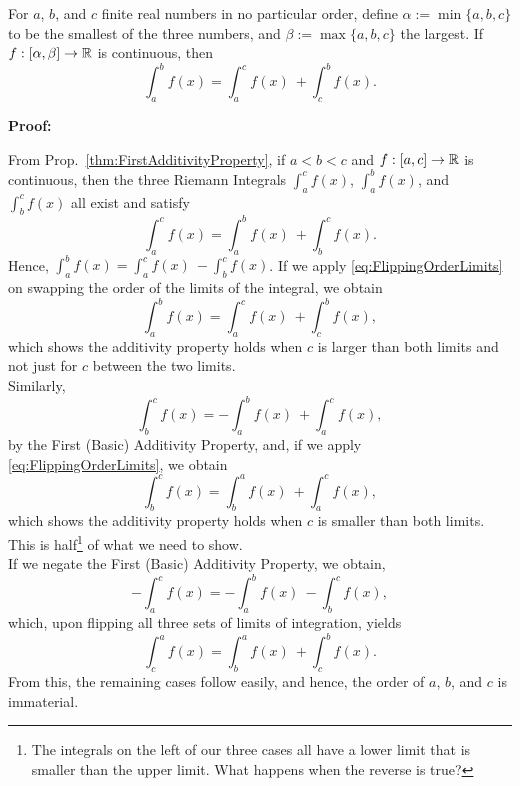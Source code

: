 \begin{tcolorbox}[title=\textcolor{black}{Proof of Cor.~\ref{thm:CorollaryFirstAdditivityProperty} (Generalized First Additivity Property)}, sharp corners, colback=green!30, colframe=green!80!blue, breakable, fonttitle=\bfseries]

For $a$, $b$, and $c$ finite real numbers in no particular order, define $\alpha:= \min\{a, b, c\}$ to be the smallest of the three numbers, and $\beta:= \max\{a, b, c\}$ the largest. If $f:[\alpha, \beta] \to \mathbb R$ is continuous, then
\begin{equation}
\label{eq:FirstAdditivityPropertyRearranged02}
    \int_{a}^{b} f(x) = \int_{a}^{c} f(x)~ + \int_{c}^{b} f(x).
\end{equation}    

\end{tcolorbox}

\textbf{Proof:} 

From Prop.~\ref{thm:FirstAdditivityProperty}, if $a < b <c$ and $f:[a, c] \to \mathbb R$ is continuous, then the three Riemann Integrals  $\int_{a}^{c} f(x)$, $\int_{a}^{b} f(x)$, and $\int_{b}^{c} f(x)$ all exist and satisfy
$$
    \int_{a}^{c} f(x) =\int_{a}^{b} f(x)~ + \int_{b}^{c} f(x).
$$
Hence,  $\int_{a}^{b} f(x) = \int_{a}^{c} f(x)~ -  \int_{b}^{c} f(x)$.
If we apply \eqref{eq:FlippingOrderLimits} on swapping the order of the limits of the integral, we obtain
$$ \int_{a}^{b} f(x)  =  \int_{a}^{c} f(x)~ +\int_{c}^{b} f(x),$$
which shows the additivity property holds when $c$ is larger than both limits and not just for $c$ between the two limits. \\

Similarly, 
$$  \int_{b}^{c} f(x) = - \int_{a}^{b} f(x)~ + \int_{a}^{c} f(x),$$
by the First (Basic) Additivity Property, and, if we apply \eqref{eq:FlippingOrderLimits}, we obtain
$$ \int_{b}^{c} f(x)  =   \int_{b}^{a} f(x)~ + \int_{a}^{c} f(x),$$
which shows the additivity property holds when $c$ is smaller than both limits. This is half\footnote{The integrals on the left of our three cases all have a lower limit that is smaller than the upper limit. What happens when the reverse is true?} of what we need to show.\\

If we negate the First (Basic) Additivity Property, we obtain,
$$
    -\int_{a}^{c} f(x) = -\int_{a}^{b} f(x)~ - \int_{b}^{c} f(x),
$$
which, upon flipping all three sets of limits of integration, yields
$$
    \int_{c}^{a} f(x) = \int_{b}^{a} f(x)~ + \int_{c}^{b} f(x).
$$
From this, the remaining cases follow easily, and hence, the order of $a$, $b$, and $c$ is immaterial.
\Qed

